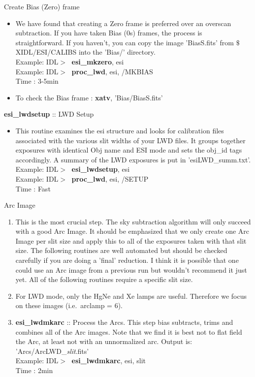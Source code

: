 \documentclass[11pt,letterpaper,dvips]{article}
\begin{document}
\begin{enumerate}

{\Large    \item Create Bias (Zero) frame}
	\begin{itemize}
	  \item We have found that creating a Zero frame is preferred
	over an overscan subtraction.  If you have taken Bias (0s) frames,
	the process is straightforward.  If you haven't, you can copy the image
	'BiasS.fits' from $\$$XIDL/ESI/CALIBS into the 'Bias/' directory.\\
         \quad Example: IDL$> \;$ {\bf esi\_mkzero}, esi \\
         \quad Example: IDL$> \;$ {\bf proc\_lwd}, esi, /MKBIAS \\
         \quad Time   : 3-5min 
	  \item To check the Bias frame : {\bf xatv}, 'Bias/BiasS.fits'
	\end{itemize}

{\Large  \item {\bf esi\_lwdsetup} :: LWD Setup}
	\begin{itemize}
	  \item This routine examines the esi structure and looks for calibration
	files associated with the various slit widths of your LWD files.  
	It groups together exposures with identical Obj name and ESI mode and
	sets the obj\_id tags accordingly.
	A summary of the LWD exposures is put in 'esiLWD\_summ.txt'. \\
         \quad Example: IDL$> \;$ {\bf esi\_lwdsetup}, esi \\
         \quad Example: IDL$> \;$ {\bf proc\_lwd}, esi, /SETUP \\
         \quad Time   : Fast
	\end{itemize}

{\Large  \item Arc Image }
  \begin{enumerate}
	\item This is the most crucial step.  The sky subtraction
	algorithm will only succeed with a good Arc Image.  It should be 
	emphasized that we only create one Arc Image per slit size and apply
	this to all of the exposures taken with that slit size.  The following
	routines are well automated but should be checked carefully if you are
	doing a 'final' reduction.  I think it is possible that one could use
	an Arc image from a previous run but wouldn't recommend it just
	yet.  All of the following routines require a specific slit size.
	\item For LWD mode, only the HgNe and Xe lamps are useful.  Therefore
	we focus on these images (i.e.\ arclamp = 6).  
	\item {\bf esi\_lwdmkarc} :: Process the Arcs.  This step bias subtracts,
	trims and combines all of the Arc images.
        Note that we find it is best not to flat field the Arc, at least not
	with an unnormalized arc. Output is: 'Arcs/ArcLWD\_{\it slit}.fits' \\
         \quad Example: IDL$> \;$ {\bf esi\_lwdmkarc}, esi, slit \\
         \quad Time   : 2min


\end{enumerate}
\end{enumerate}
\end{document}

